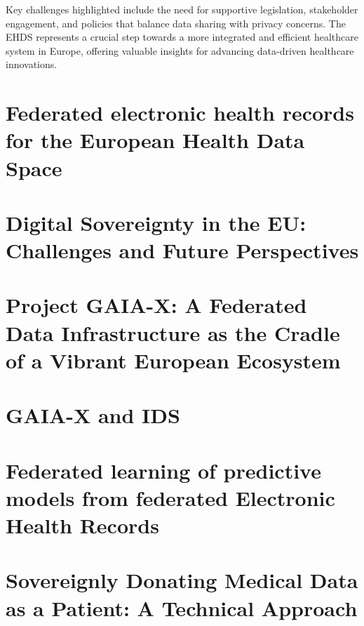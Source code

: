 Key challenges highlighted include the need for supportive legislation, stakeholder engagement, and policies that balance data sharing with privacy concerns.
The EHDS represents a crucial step towards a more integrated and efficient healthcare system in Europe, offering valuable insights for advancing data-driven healthcare innovations.

\section{Federated electronic health records for the European Health Data Space}\label{sec:federated-electronic-health-records-for-the-european-health-data-space}

\section{Digital Sovereignty in the EU: Challenges and Future Perspectives}\label{sec:digital-sovereignty-in-the-eu:-challenges-and-future-perspectives}

\section{Project GAIA-X: A Federated Data Infrastructure as the Cradle of a Vibrant European Ecosystem}\label{sec:project-gaia-x:-a-federated-data-infrastructure-as-the-cradle-of-a-vibrant-european-ecosystem}

\section{GAIA-X and IDS}\label{sec:gaia-x-and-ids}

\section{Federated learning of predictive models from federated Electronic Health Records}\label{sec:federated-learning-of-predictive-models-from-federated-electronic-health-records}

\section{Sovereignly Donating Medical Data as a Patient: A Technical Approach}\label{sec:sovereignly-donating-medical-data-as-a-patient:-a-technical-approach}
